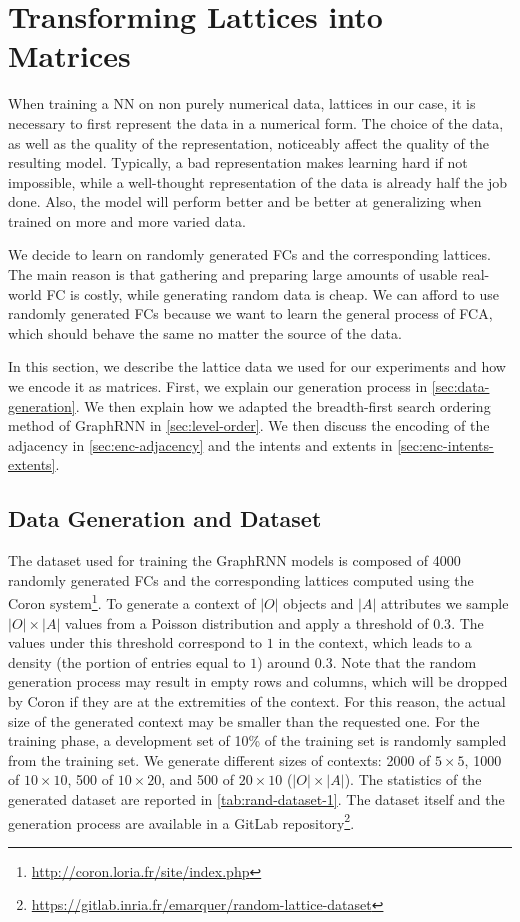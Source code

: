 
\section{Transforming Lattices into Matrices\label{sec:data-format}}
When training a NN on non purely numerical data, lattices in our case, it is necessary to first represent the data in a numerical form.
The choice of the data, as well as the quality of the representation, noticeably affect the quality of the resulting model.
Typically, a bad representation makes learning hard if not impossible, while a well-thought representation of the data is already half the job done.
Also, the model will perform better and be better at generalizing when trained on more and more varied data.

We decide to learn on randomly generated FCs and the corresponding lattices.
The main reason is that gathering and preparing large amounts of usable real-world FC is costly, while generating random data is cheap.
We can afford to use randomly generated FCs because we want to learn the general process of FCA, which should behave the same no matter the source of the data.

In this section, we describe the lattice data we used for our experiments and how we encode it as matrices.
First, we explain our generation process in \cref{sec:data-generation}.
We then explain how we adapted the breadth-first search ordering method of GraphRNN in \cref{sec:level-order}.
We then discuss the encoding of the adjacency in \cref{sec:enc-adjacency} and the intents and extents in \cref{sec:enc-intents-extents}.

\subsection{Data Generation and Dataset\label{sec:data-generation}}
The dataset used for training the GraphRNN models is composed of 4000 randomly generated FCs and the corresponding lattices computed using the Coron system\footnote{\url{http://coron.loria.fr/site/index.php}}.
To generate a context of $|O|$ objects and $|A|$ attributes we sample $|O|\times|A|$ values from a Poisson distribution and apply a threshold of $0.3$.
The values under this threshold correspond to $1$ in the context, which leads to a density (the portion of entries equal to $1$) around $0.3$.
Note that the random generation process may result in empty rows and columns, which will be dropped by Coron if they are at the extremities of the context.
For this reason, the actual size of the generated context may be smaller than the requested one.
For the training phase, a development set of 10\% of the training set is randomly sampled from the training set. 
We generate different sizes of contexts: 2000 of $5 \times 5$, 1000 of $10 \times 10$, 500 of $10 \times 20$, and 500 of $20 \times 10$ ($|O|\times|A|$).
The statistics of the generated dataset are reported in \cref{tab:rand-dataset-1}.
The dataset itself and the generation process are available in a GitLab repository\footnote{\url{https://gitlab.inria.fr/emarquer/random-lattice-dataset}}.

